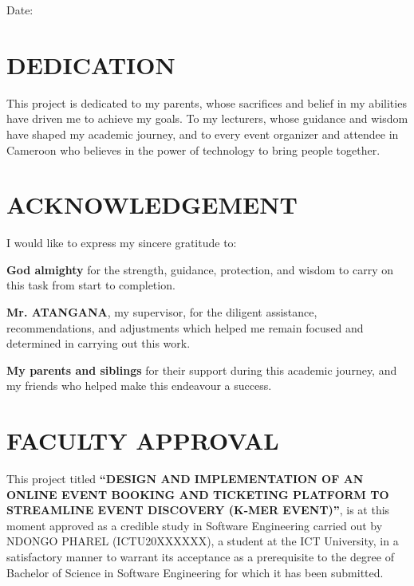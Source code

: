 \documentclass[12pt,a4paper]{report}
\begin{document}
\vspace{1.0cm}
\noindent Date: \underline{\hspace{6cm}}

\chapter*{DEDICATION}
This project is dedicated to my parents, whose sacrifices and belief in my abilities have
driven me to achieve my goals. To my lecturers, whose guidance and wisdom have shaped my
academic journey, and to every event organizer and attendee in Cameroon who believes in
the power of technology to bring people together.

\chapter*{ACKNOWLEDGEMENT}
I would like to express my sincere gratitude to:\par
\textbf{God almighty} for the strength, guidance, protection, and wisdom to carry on this
task from start to completion.\par
\textbf{Mr. ATANGANA}, my supervisor, for the diligent assistance, recommendations, and
adjustments which helped me remain focused and determined in carrying out this work.\par
\textbf{My parents and siblings} for their support during this academic journey, and my
friends who helped make this endeavour a success.

\chapter*{FACULTY APPROVAL}
This project titled \textbf{``DESIGN AND IMPLEMENTATION OF AN ONLINE EVENT BOOKING AND
TICKETING PLATFORM TO STREAMLINE EVENT DISCOVERY (K-MER EVENT)''}, is at this moment
approved as a credible study in Software Engineering carried out by NDONGO PHAREL
(ICTU20XXXXXX), a student at the ICT University, in a satisfactory manner to warrant its
acceptance as a prerequisite to the degree of Bachelor of Science in Software Engineering
for which it has been submitted.
\end{document}
